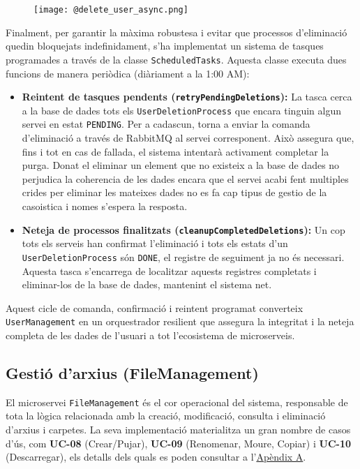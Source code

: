 \begin{figure}[H]
    \centering
    \texttt{[image: @delete\_user\_async.png]}
\end{figure}

Finalment, per garantir la màxima robustesa i evitar que processos d'eliminació quedin bloquejats indefinidament, s'ha implementat un sistema de tasques programades a través de la classe \texttt{ScheduledTasks}. Aquesta classe executa dues funcions de manera periòdica (diàriament a la 1:00 AM):
\begin{itemize}
    \item \textbf{Reintent de tasques pendents (\texttt{retryPendingDeletions}):} La tasca cerca a la base de dades tots els \texttt{UserDeletionProcess} que encara tinguin algun servei en estat \texttt{PENDING}. Per a cadascun, torna a enviar la comanda d'eliminació a través de RabbitMQ al servei corresponent. Això assegura que, fins i tot en cas de fallada, el sistema intentarà activament completar la purga. Donat el eliminar un element que no existeix a la base de dades no perjudica la coherencia de les dades encara que el servei acabi fent multiples crides per eliminar les mateixes dades no es fa cap tipus de gestio de la casoistica i nomes s'espera la resposta.
    \item \textbf{Neteja de processos finalitzats (\texttt{cleanupCompletedDeletions}):} Un cop tots els serveis han confirmat l'eliminació i tots els estats d'un \texttt{UserDeletionProcess} són \texttt{DONE}, el registre de seguiment ja no és necessari. Aquesta tasca s'encarrega de localitzar aquests registres completats i eliminar-los de la base de dades, mantenint el sistema net.
\end{itemize}
Aquest cicle de comanda, confirmació i reintent programat converteix \texttt{UserManagement} en un orquestrador resilient que assegura la integritat i la neteja completa de les dades de l'usuari a tot l'ecosistema de microserveis.


\subsection{Gestió d'arxius (FileManagement)}

El microservei \texttt{FileManagement} és el cor operacional del sistema, responsable de tota la lògica relacionada amb la creació, modificació, consulta i eliminació d'arxius i carpetes. La seva implementació materialitza un gran nombre de casos d'ús, com \textbf{UC-08} (Crear/Pujar), \textbf{UC-09} (Renomenar, Moure, Copiar) i \textbf{UC-10} (Descarregar), els detalls dels quals es poden consultar a l'\hyperref[app:casos_us]{Apèndix A}.

